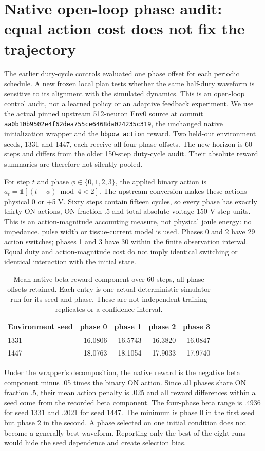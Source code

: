 \section{Native open-loop phase audit: equal action cost does not fix the trajectory}
The earlier duty-cycle controls evaluated one phase offset for each periodic schedule. A new frozen local plan tests whether the same half-duty waveform is sensitive to its alignment with the simulated dynamics. This is an open-loop control audit, not a learned policy or an adaptive feedback experiment. We use the actual pinned upstream 512-neuron Env0 source at commit \texttt{aa0b10b9502e4f62dea755ce6468da024235c319}, the unchanged native initialization wrapper and the \texttt{bbpow\_action} reward. Two held-out environment seeds, 1331 and 1447, each receive all four phase offsets. The new horizon is 60 steps and differs from the older 150-step duty-cycle audit. Their absolute reward summaries are therefore not silently pooled.

For step $t$ and phase $\phi\in\{0,1,2,3\}$, the applied binary action is $a_t=\mathbb{1}[(t+\phi)\bmod4<2]$. The upstream conversion makes these actions physical 0 or +5 V. Sixty steps contain fifteen cycles, so every phase has exactly thirty ON actions, ON fraction .5 and total absolute voltage 150 V-step units. This is an action-magnitude accounting measure, not physical joule energy: no impedance, pulse width or tissue-current model is used. Phases 0 and 2 have 29 action switches; phases 1 and 3 have 30 within the finite observation interval. Equal duty and action-magnitude cost do not imply identical switching or identical interaction with the initial state.

\begin{table}[ht]\centering
\caption{Mean native beta reward component over 60 steps, all phase offsets retained. Each entry is one actual deterministic simulator run for its seed and phase. These are not independent training replicates or a confidence interval.}
\begin{tabular}{lrrrr}\hline
Environment seed & phase 0 & phase 1 & phase 2 & phase 3\\\hline
1331 & 16.0806 & 16.5743 & 16.3820 & 16.0847\\
1447 & 18.0763 & 18.1054 & 17.9033 & 17.9740\\\hline
\end{tabular}\end{table}

Under the wrapper's decomposition, the native reward is the negative beta component minus .05 times the binary ON action. Since all phases share ON fraction .5, their mean action penalty is .025 and all reward differences within a seed come from the recorded beta component. The four-phase beta range is .4936 for seed 1331 and .2021 for seed 1447. The minimum is phase 0 in the first seed but phase 2 in the second. A phase selected on one initial condition does not become a generally best waveform. Reporting only the best of the eight runs would hide the seed dependence and create selection bias.

